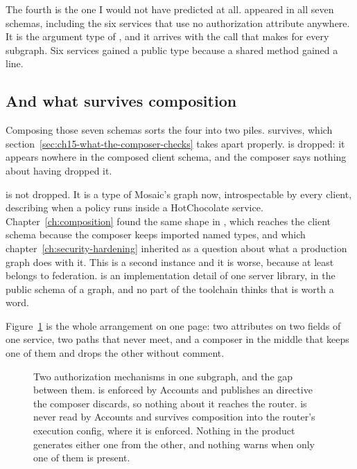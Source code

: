 The fourth is the one I would not have predicted at all.  appeared in all seven schemas, including the six services that use
no authorization attribute anywhere. It is the argument type of
, and it arrives with the  call that
 makes for every subgraph. Six services gained a public
type because a shared method gained a line.

\subsection*{And what survives composition}

%
Composing those seven schemas sorts the four into two piles.
 survives, which
section~\ref{sec:ch15-what-the-composer-checks} takes apart properly.
 is dropped: it appears nowhere in the composed client schema,
and the composer says nothing about having dropped it.

 is not dropped. It is a type of Mosaic's graph now,
introspectable by every client, describing when a policy runs inside a
HotChocolate service. Chapter~\ref{ch:composition} found the same shape in
, which reaches the client schema because the composer
keeps imported named types, and which chapter~\ref{ch:security-hardening}
inherited as a question about what a production graph does with it. This is a
second instance and it is worse, because  at least belongs to
federation.  is an implementation detail of one server
library, in the public schema of a graph, and no part of the toolchain thinks
that is worth a word.

Figure~\ref{fig:ch15-two-authorizations} is the whole arrangement on one page:
two attributes on two fields of one service, two paths that never meet, and a
composer in the middle that keeps one of them and drops the other without
comment.

\begin{figure}[htbp]
  \centering
  
  \caption{Two authorization mechanisms in one subgraph, and the gap between
  them. \code{[Authorize]} is enforced by Accounts and publishes an
   directive the composer discards, so nothing about it
  reaches the router. \code{[RequiresScopes]} is never read by Accounts and
  survives composition into the router's execution config, where it is
  enforced. Nothing in the product generates either one from the other, and
  nothing warns when only one of them is present.}
  \label{fig:ch15-two-authorizations}
\end{figure}

